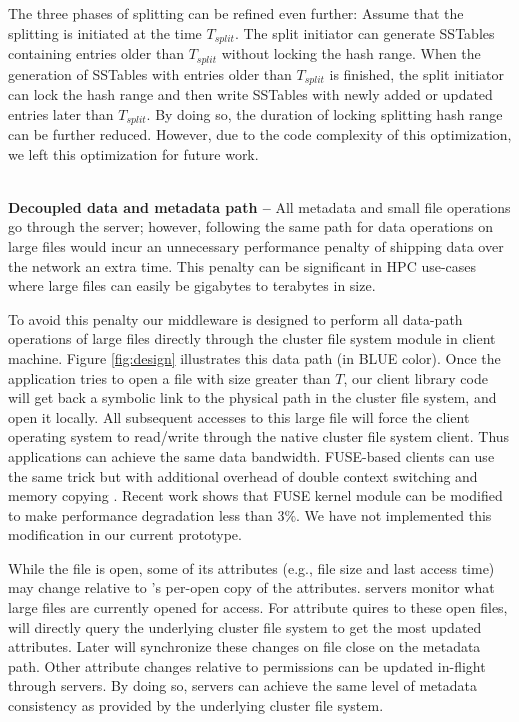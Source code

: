 The three phases of splitting can be refined even further:
Assume that the splitting is initiated at the time $T_{split}$.
The split initiator can generate SSTables containing entries
older than $T_{split}$ without locking the hash range.
When the generation of SSTables with entries older than $T_{split}$ is finished,
the split initiator can lock the hash range and then write SSTables with
newly added or updated entries later than $T_{split}$.
By doing so, the duration of locking splitting hash range can be further reduced.
However, due to the code complexity of this optimization,
we left this optimization for future work.

~\\
\textbf{Decoupled data and metadata path -- }
All metadata and small file operations go through the \giga server;
however, following the same path for data operations on large files
would incur an unnecessary performance penalty of shipping data
over the network an extra time.
This penalty can be significant in HPC use-cases
where large files can easily be gigabytes to terabytes in size.

To avoid this penalty our middleware is designed to perform all
data-path operations of large files directly
through the cluster file system module in client machine.
Figure \ref{fig:design} illustrates this data path (in BLUE color).
Once the application tries to open a file with size greater than $T$,
our client library code will get back a symbolic link to the physical
path in the cluster file system, and open it locally.
All subsequent accesses to this large file will force
the client operating system to read/write through the native cluster file system client.
Thus applications can achieve the same data bandwidth.
FUSE-based clients can use the same trick but with additional overhead
of double context switching and memory copying \cite{PLFS}.
Recent work \cite{fuseopt} shows that FUSE kernel module can be modified
to make performance degradation less than $3\%$. We have not implemented
this modification in our current prototype.

While the file is open, some of its attributes (e.g., file size and last access time)
may change relative to \tfs's per-open copy of the attributes.
\giga servers monitor what large files are currently opened for access.
For attribute quires to these open files, \giga will directly query the underlying
cluster file system to get the most updated attributes.
Later \giga will synchronize these changes on file close on the metadata path.
Other attribute changes relative to permissions can be updated in-flight
through \giga servers.
By doing so, \giga servers can achieve the same level of metadata consistency
as provided by the underlying cluster file system.


